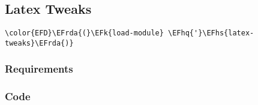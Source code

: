 \documentclass[a4wide,10pt]{article}
\newcommand{\EFk}[1]{\textcolor{EFk}{#1}} %
\newcommand{\EFhq}[1]{\textcolor{EFhq}{#1}} %
\newcommand{\EFhs}[1]{\textcolor{EFhs}{#1}} %
\newcommand{\EFrda}[1]{\textcolor{EFrda}{#1}} %
\begin{document}
\subsection{Latex Tweaks}
\label{sec:orgaf9554d}
\begin{Code}
\begin{Verbatim}
\color{EFD}\EFrda{(}\EFk{load-module} \EFhq{'}\EFhs{latex-tweaks}\EFrda{)}
\end{Verbatim}
\end{Code}
\subsubsection{Requirements}
\label{sec:orgd24e93f}
\subsubsection{Code}
\label{sec:orgda5adc7}
\end{document}
